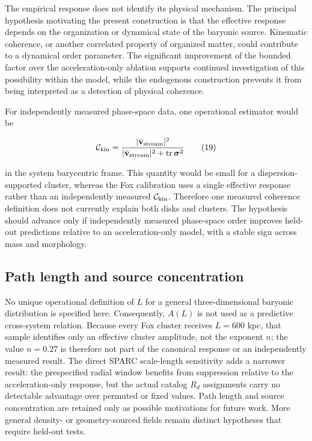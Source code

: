 \documentclass[utf8]{FrontiersinHarvard}
\begin{document}
The empirical response does not identify its physical mechanism. The principal hypothesis motivating the present construction is that the effective response depends on the organization or dynamical state of the baryonic source. Kinematic coherence, or another correlated property of organized matter, could contribute to a dynamical order parameter. The significant improvement of the bounded factor over the acceleration-only ablation supports continued investigation of this possibility within the model, while the endogenous construction prevents it from being interpreted as a detection of physical coherence.

For independently measured phase-space data, one operational estimator would be

\[
\mathcal C_{\rm kin}=
\frac{|\bar{\mathbf v}_{\rm stream}|^2}
{|\bar{\mathbf v}_{\rm stream}|^2+
{\rm tr}\,\boldsymbol{\sigma}^2}
\tag{19}
\]

in the system barycentric frame. This quantity would be small for a dispersion-supported cluster, whereas the Fox calibration uses a single effective response rather than an independently measured \(\mathcal C_{\rm kin}\). Therefore one measured coherence definition does not currently explain both disks and clusters. The hypothesis should advance only if independently measured phase-space order improves held-out predictions relative to an acceleration-only model, with a stable sign across mass and morphology.

\subsection{Path length and source concentration}\label{path-length-and-source-concentration}

No unique operational definition of \(L\) for a general three-dimensional baryonic distribution is specified here. Consequently, \(A(L)\) is not used as a predictive cross-system relation. Because every Fox cluster receives \(L=600\) kpc, that sample identifies only an effective cluster amplitude, not the exponent \(n\); the value \(n=0.27\) is therefore not part of the canonical response or an independently measured result. The direct SPARC scale-length sensitivity adds a narrower result: the prespecified radial window benefits from suppression relative to the acceleration-only response, but the actual catalog \(R_d\) assignments carry no detectable advantage over permuted or fixed values. Path length and source concentration are retained only as possible motivations for future work. More general density- or geometry-sourced fields remain distinct hypotheses that require held-out tests.
\end{document}
